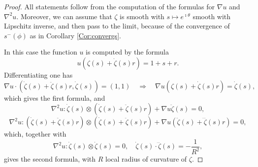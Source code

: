 \documentclass[reqno]{amsart}
\newcounter{assu}
\theoremstyle{definition} \newtheorem{definition}{Definition}[section]
\theoremstyle{definition} \newtheorem{remark}[definition]{Remark}
\theoremstyle{plain} \newtheorem{lemma}[definition]{Lemma}
\theoremstyle{plain} \newtheorem{proposition}[definition]{Proposition}
\theoremstyle{plain} \newtheorem{theorem}[definition]{Theorem}
\theoremstyle{plain} \newtheorem{corollary}[definition]{Corollary}
\theoremstyle{definition} \newtheorem{example}[definition]{Example}
\theoremstyle{plain} \newtheorem{claim}[clai]{Claim}
\theoremstyle{definition} \newtheorem{assumption}[definition]{Assumption}
\theoremstyle{definition} \newtheorem{observation}[definition]{Observation}
\newcommand{\1}{\mathbbm 1}
\renewcommand{\i}{\imath}
\numberwithin{equation}{section} %
\theoremstyle{plain} \newtheorem*{theorem*}{Theorem}
\theoremstyle{plain} \newtheorem{mthm}[maintheorem]{Main Theorem}
\theoremstyle{plain} \newtheorem*{mthm*}{Main Theorem}
\theoremstyle{plain} \newtheorem*{conjecture*}{Conjecture}
\theoremstyle{plain} \newtheorem{conjecture}[definition]{Conjecture}
\theoremstyle{plain} \newtheorem*{problem*}{Problem}
\begin{document}
\begin{proof}
All statements follow from the computation of the formulas for $\nabla u$ and $\nabla^2 u$. Moreover, we can assume that $\zeta$ is smooth with $s \mapsto e^{\i \theta}$ smooth with Lipschitz inverse, and then pass to the limit, because of the convergence of $s^-(\phi)$ as in Corollary \ref{Cor:convergs}.

In this case the function $u$ is computed by the formula
\begin{equation*}
u(\zeta(s) + \dot \zeta(s) r) = 1 + s + r.
\end{equation*}
Differentiating one has
\begin{equation*}
\nabla u \cdot (\dot \zeta(s) + \ddot \zeta(s) r, \dot \zeta(s)) = (1,1) \quad \Rightarrow \quad \nabla u(\zeta(s) + \dot \zeta(s) r) = \dot \zeta(s),
\end{equation*}
which gives the first formula, and
\begin{equation*}
\nabla^2 u : \dot \zeta(s) \otimes (\dot \zeta(s) + \ddot \zeta(s) r) + \nabla u \ddot \zeta(s) = 0,
\end{equation*}
\begin{equation*}
\nabla^2 u : (\dot \zeta(s) + \ddot \zeta(s) r) \otimes (\dot \zeta(s) + \ddot \zeta(s) r) + \nabla u (\ddot \zeta(s) + \dddot \zeta(s) r) = 0,
\end{equation*}
which, together with
$$
\nabla^2 u : \dot \zeta(s) \otimes \dot \zeta(s) = 0, \quad \dot \zeta(s) \cdot \dddot \zeta(s) = - \frac{1}{R^2},
$$
gives the second formula, with $R$ local radius of curvature of $\zeta$.


\end{proof}
\end{document}
